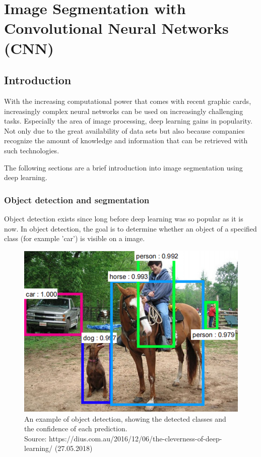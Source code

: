 
\chapter{Image Segmentation with Convolutional Neural Networks (CNN)}\label{chp:segmentation_with_neural_networks}
\section{Introduction}
With the increasing computational power that comes with recent graphic cards, increasingly complex neural networks can be used on increasingly challenging tasks. Especially the area of image processing, deep learning gains in popularity. Not only due to the great availability of data sets but also because companies recognize the amount of knowledge and information that can be retrieved with such technologies.

The following sections are a brief introduction into image segmentation using deep learning.

\subsection{Object detection and segmentation}
Object detection exists since long before deep learning was so popular as it is now. In object detection, the goal is to determine whether an object of a specified class (for example 'car') is visible on a image. 

\begin{figure}[H]
    \centering
	\includegraphics[width=0.6\linewidth]{chapters/neural_networks/images/object_detection.png}
	\caption{An example of object detection, showing the detected classes and the confidence of each prediction.\\ Source: https://dius.com.au/2016/12/06/the-cleverness-of-deep-learning/ (27.05.2018)}
	\label{fig:neural_networks:object_detection}
\end{figure}

